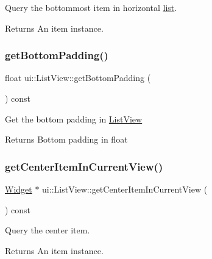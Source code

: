 Query the bottommost item in horizontal \hyperlink{protocollist-p}{list}. 

\begin{DoxyReturn}{Returns}
An item instance. 
\end{DoxyReturn}
\mbox{\label{classui_1_1ListView_ae537c409ff29867ea5b747ddf048fd7c}} 
\subsubsection{\texorpdfstring{get\+Bottom\+Padding()}{getBottomPadding()}}
{\footnotesize\ttfamily float ui\+::\+List\+View\+::get\+Bottom\+Padding (\begin{DoxyParamCaption}{ }\end{DoxyParamCaption}) const}

Get the bottom padding in \hyperlink{classui_1_1ListView}{List\+View} \begin{DoxyReturn}{Returns}
Bottom padding in float 
\end{DoxyReturn}
\mbox{\label{classui_1_1ListView_a7647c121e0fd17ad5cac0f6a76f9791b}} 
\subsubsection{\texorpdfstring{get\+Center\+Item\+In\+Current\+View()}{getCenterItemInCurrentView()}\hspace{0.1cm}{\footnotesize\ttfamily [1/2]}}
{\footnotesize\ttfamily \hyperlink{classui_1_1Widget}{Widget} $\ast$ ui\+::\+List\+View\+::get\+Center\+Item\+In\+Current\+View (\begin{DoxyParamCaption}{ }\end{DoxyParamCaption}) const}



Query the center item. 

\begin{DoxyReturn}{Returns}
An item instance. 
\end{DoxyReturn}
\mbox{\label{classui_1_1ListView_af2e7fa5bfed742f093ad2b83361cabb3}} 
